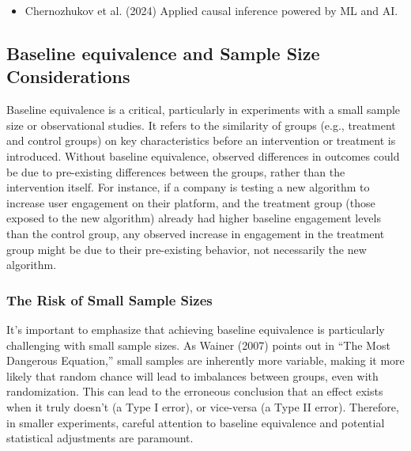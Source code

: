 \documentclass[
  letterpaper,
  DIV=11,
  numbers=noendperiod]{scrreprt}
\providecommand{\tightlist}{%
  \setlength{\itemsep}{0pt}\setlength{\parskip}{0pt}}\usepackage{longtable,booktabs,array}
\begin{document}
\begin{tcolorbox}[enhanced jigsaw, colframe=quarto-callout-tip-color-frame, left=2mm, toprule=.15mm, colbacktitle=quarto-callout-tip-color!10!white, title=\textcolor{quarto-callout-tip-color}{\faLightbulb}\hspace{0.5em}{Learn more}, coltitle=black, rightrule=.15mm, leftrule=.75mm, colback=white, arc=.35mm, bottomtitle=1mm, bottomrule=.15mm, breakable, titlerule=0mm, opacitybacktitle=0.6, toptitle=1mm, opacityback=0]

\begin{itemize}
\tightlist
\item
  Chernozhukov et al. (2024) Applied causal inference powered by ML and
  AI.
\end{itemize}

\end{tcolorbox}

\subsection{Baseline equivalence and Sample Size
Considerations}\label{baseline-equivalence-and-sample-size-considerations}

Baseline equivalence is a critical, particularly in experiments with a
small sample size or observational studies. It refers to the similarity
of groups (e.g., treatment and control groups) on key characteristics
before an intervention or treatment is introduced. Without baseline
equivalence, observed differences in outcomes could be due to
pre-existing differences between the groups, rather than the
intervention itself. For instance, if a company is testing a new
algorithm to increase user engagement on their platform, and the
treatment group (those exposed to the new algorithm) already had higher
baseline engagement levels than the control group, any observed increase
in engagement in the treatment group might be due to their pre-existing
behavior, not necessarily the new algorithm.

\subsubsection{The Risk of Small Sample
Sizes}\label{the-risk-of-small-sample-sizes}

It's important to emphasize that achieving baseline equivalence is
particularly challenging with small sample sizes. As Wainer (2007)
points out in ``The Most Dangerous Equation,'' small samples are
inherently more variable, making it more likely that random chance will
lead to imbalances between groups, even with randomization. This can
lead to the erroneous conclusion that an effect exists when it truly
doesn't (a Type I error), or vice-versa (a Type II error). Therefore, in
smaller experiments, careful attention to baseline equivalence and
potential statistical adjustments are paramount.
\end{document}
